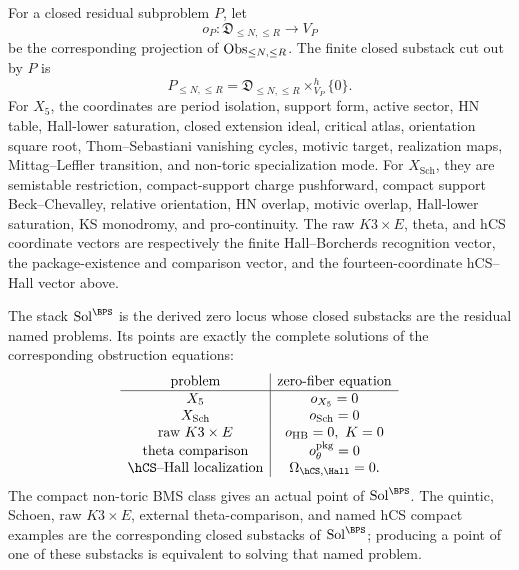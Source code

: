 \begin{definition}
\label{def:bps-positive-residual-obstruction-coordinates}
For a closed residual subproblem \(P\), let
\[
o_P:\mathfrak D_{\leq N,\leq R}\longrightarrow V_P
\]
be the corresponding projection of \(\mathrm{Obs}_{\leq N,\leq R}\). The
finite closed substack cut out by \(P\) is
\[
P_{\leq N,\leq R}
=
\mathfrak D_{\leq N,\leq R}\times^h_{V_P}\{0\}.
\]
For \(X_5\), the coordinates are period isolation, support form, active
sector, HN table, Hall-lower saturation, closed extension ideal,
critical atlas, orientation square root, Thom--Sebastiani vanishing
cycles, motivic target, realization maps, Mittag--Leffler transition,
and non-toric specialization mode. For \(X_{\mathrm{Sch}}\), they are
semistable restriction, compact-support charge pushforward, compact
support Beck--Chevalley, relative orientation, HN overlap, motivic
overlap, Hall-lower saturation, KS monodromy, and pro-continuity. The
raw \(K3\times E\), theta, and hCS coordinate vectors are respectively
the finite Hall--Borcherds recognition vector, the package-existence
and comparison vector, and the fourteen-coordinate hCS--Hall vector
above.
\end{definition}

\begin{theorem}
\label{thm:bps-positive-derived-solution-stack}
The stack \(\Sol^{\BPS}\) is the derived zero locus whose closed
substacks are the residual named problems. Its points are exactly the
complete solutions of the corresponding obstruction equations:
\[
\begin{array}{c|c}
\text{problem} & \text{zero-fiber equation}\\
\hline
X_5 & o_{X_5}=0\\
X_{\mathrm{Sch}} & o_{\mathrm{Sch}}=0\\
\text{raw }K3\times E & o_{\mathrm{HB}}=0,\ K=0\\
\text{theta comparison} & o_{\theta}^{\mathrm{pkg}}=0\\
\hCS\text{--Hall localization} &
\Omega_{\hCS,\Hall}=0.
\end{array}
\]
The compact non-toric BMS class gives an actual point of
\(\Sol^{\BPS}\). The quintic, Schoen, raw \(K3\times E\), external
theta-comparison, and named hCS compact examples are the corresponding
closed substacks of \(\Sol^{\BPS}\); producing a point of one of these
substacks is equivalent to solving that named problem.
\end{theorem}

